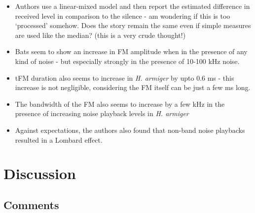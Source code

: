 \documentclass[
]{book}
\providecommand{\tightlist}{%
  \setlength{\itemsep}{0pt}\setlength{\parskip}{0pt}}
\begin{document}
\begin{itemize}
\tightlist
\item
  Authors use a linear-mixed model and then report the estimated difference in received level in comparison to the silence - am wondering if this is too `processed' somehow. Does the story remain the same even if simple measures are used like the median? (this is a very crude thought!)
\item
  Bats seem to show an increase in FM amplitude when in the presence of any kind of noise - but especially strongly in the presence of 10-100 kHz noise.
\item
  tFM duration also seems to increase in \emph{H. armiger} by upto 0.6 ms - this increase is not negligible, considering the FM itself can be just a few ms long.
\item
  The bandwidth of the FM also seems to increase by a few kHz in the presence of increasing noise playback levels in \emph{H. armiger}
\item
  Against expectations, the authors also found that non-band noise playbacks resulted in a Lombard effect.
\end{itemize}

\hypertarget{discussion}{%
\section{Discussion}\label{discussion}}

\hypertarget{comments}{%
\subsection{Comments}\label{comments}}
\end{document}
